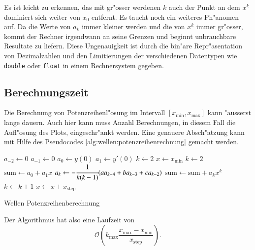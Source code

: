 Es ist leicht zu erkennen, das mit gr"osser werdenen $k$ auch der Punkt an dem 
$x^k$ dominiert sich weiter von $x_0$ entfernt. Es taucht noch ein weiteres 
Ph"anomen auf. Da die Werte von $a_k$ immer kleiner werden und die von $x^k$ 
immer gr"osser, kommt der Rechner irgendwann an seine Grenzen und beginnt 
unbrauchbare Resultate zu liefern. Diese Ungenauigkeit ist durch die bin"are 
Repr"asentation von Dezimalzahlen und den Limitierungen der verschiedenen 
Datentypen wie \texttt{double} oder \texttt{float} in einem Rechnersystem 
gegeben.

\subsection{Berechnungszeit}
Die Berechnung von Potenzreihenl"osung im Intervall
$[x_{\text{min}},x_{\text{max}}]$ kann "ausserst lange dauern. Auch hier kann
muss Anzahl Berechnungen, in diesem Fall die Aufl"osung des Plots,
eingeschr"ankt werden. Eine genauere Absch"atzung kann mit Hilfe des
Pseudocodes \ref{alg:wellen:potenzreihenrechnung} gemacht werden.

\begin{algorithm}
	\begin{algorithmic}[1]
		\State $a_{-2} \gets 0$
		\State $a_{-1} \gets 0$
		\State $a_0 \gets y(0)$
		\State $a_1 \gets y'(0)$
		\State $k \gets 2$
		\State $x \gets x_{\text{min}}$
			\State $k \gets 2$
			\State $\text{sum} \gets a_0 + a_1x$
				\State $a_k \gets -\cfrac{1}{k(k-1)}			
				(aa_{k-4}+ba_{k-3}+ca_{k-2})$
				\State $\text{sum} \gets \text{sum} + a_k x^k$
				\State $k \gets k + 1$
			\EndFor
			\State $x \gets x + x_{\text{step}}$
		\EndFor
	\end{algorithmic}
	\caption{Wellen Potenzreihenberechnung} 
	\label{alg:wellen:potenzreihenrechnung}
\end{algorithm}

Der Algorithmus hat also eine Laufzeit von
\begin{equation*}
	\mathcal{O}\left(k_{\text{max}}\frac{x_{\text{max}}-x_{\text{min}}} 
	{x_{\text{step}}}\right).
\end{equation*}

